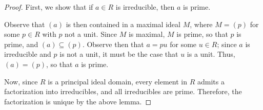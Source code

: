 \documentclass[10pt]{mypackage}
\begin{document}
\begin{proof}
  First, we show that if $a\in R$ is irreducible, then $a$ is prime.%

  Observe that $\left( a \right)$ is then contained in a maximal ideal $M$, where $M = \left( p \right)$ for some $p\in R$ with $p$ not a unit. Since $M$ is maximal, $M$ is prime, so that $p$ is prime, and $\left( a \right)\subseteq \left( p \right)$. Observe then that $a = pu$ for some $u\in R$; since $a$ is irreducible and $p$ is not a unit, it must be the case that $u$ is a unit. Thus, $\left( a \right) = \left( p \right)$, so that $a$ is prime.%

  Now, since $R$ is a principal ideal domain, every element in $R$ admits a factorization into irreducibles, and all irreducibles are prime. Therefore, the factorization is unique by the above lemma.
\end{proof}
\end{document}
